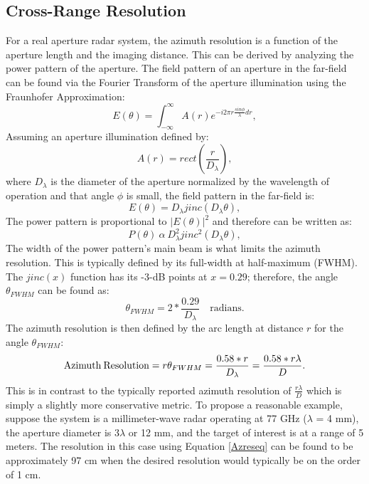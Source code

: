 \documentclass{article}
\begin{document}
\subsection{Cross-Range Resolution}
\indent\indent
For a real aperture radar system, the azimuth resolution is a function of the aperture length and the imaging distance. This can be derived by analyzing the power pattern of the aperture. The field pattern of an aperture in the far-field can be found via the Fourier Transform of the aperture illumination using the Fraunhofer Approximation:
\begin{equation}
\label{Fraun}
E(\theta) = \int_{-\infty}^{\infty} A(r)e^{-i2\pi{r}\frac{sin\phi}{\lambda} dr},
\end{equation}
Assuming an aperture illumination defined by:
\begin{equation}
\label{ApertureIllum}
A(r) = rect(\frac{r}{D_{\lambda}}),
\end{equation}
where $D_\lambda$ is the diameter of the aperture normalized by the wavelength of operation and that angle $\phi$ is small, the field pattern in the far-field is:
\begin{equation}
\label{FieldPat}
E(\theta) = D_{\lambda}jinc(D_{\lambda}\theta),
\end{equation}
The power pattern is proportional to $|E(\theta)|^2$ and therefore can be written as:
\begin{equation}
\label{PowerPat}
P(\theta)\: \alpha \: D_{\lambda}^2 jinc^2(D_{\lambda}\theta),
\end{equation}
 The width of the power pattern's main beam is what limits the azimuth resolution. This is typically defined by its full-width at half-maximum (FWHM). The $jinc(x)$ function has its -3-dB points at $x = 0.29$; therefore, the angle $\theta_{FWHM}$ can be found as:
\begin{equation}
\label{thetaFWHM}
\theta_{FWHM} = 2*\frac{0.29}{D_\lambda} \quad \text{radians}.
\end{equation}
The azimuth resolution is then defined by the arc length at distance $r$ for the angle $\theta_{FWHM}$:
\begin{equation}
\label{Azreseq}
\text{Azimuth\:Resolution} = r\theta_{FWHM} = \frac{0.58*r}{D_\lambda} = \frac{0.58*r\lambda}{D}.
\end{equation}
This is in contrast to the typically reported azimuth resolution of $\frac{r\lambda}{D}$ which is simply a slightly more conservative metric.
\newline
\indent
To propose a reasonable example, suppose the system is a millimeter-wave radar operating at 77 GHz ($\lambda$ = 4 mm), the aperture diameter is 3$\lambda$ or 12 mm, and the target of interest is at a range of 5 meters. The resolution in this case using Equation \ref{Azreseq} can be found to be approximately 97 cm when the desired resolution would typically be on the order of 1 cm. 
\end{document}
